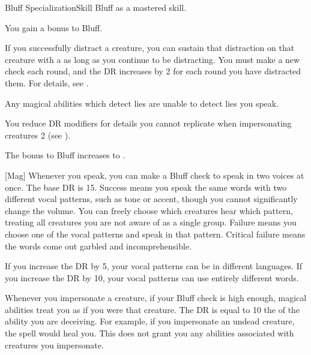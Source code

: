     \begin{feat}{Bluff Specialization}{Skill}
        \featpre Bluff as a mastered skill.
        \featben

         You gain a  bonus to Bluff.

         If you successfully distract a creature, you can sustain that distraction on that creature with a  as long as you continue to be distracting.
        You must make a new check each round, and the DR increases by 2 for each round you have distracted them.
        For details, see .

         Any magical abilities which detect lies are unable to detect lies you speak.


         You reduce DR modifiers for details you cannot replicate when impersonating creatures 2 (see ).

         The bonus to Bluff increases to .

        [Mag] Whenever you speak, you can make a Bluff check to speak in two voices at once.
        The base DR is 15.
        Success means you speak the same words with two different vocal patterns, such as tone or accent, though you cannot significantly change the volume.
        You can freely choose which creatures hear which pattern, treating all creatures you are not aware of as a single group.
        Failure means you choose one of the vocal patterns and speak in that pattern.
        Critical failure means the words come out garbled and incomprehensible.

        If you increase the DR by 5, your vocal patterns can be in different languages.
        If you increase the DR by 10, your vocal patterns can use entirely different words.

         Whenever you impersonate a creature, if your Bluff check is high enough, magical abilities treat you as if you were that creature.
        The DR is equal to 10 \add the  of the ability you are deceiving.
        For example, if you impersonate an undead creature, the  spell would heal you.
        This does not grant you any abilities associated with creatures you impersonate.


\end{feat}
